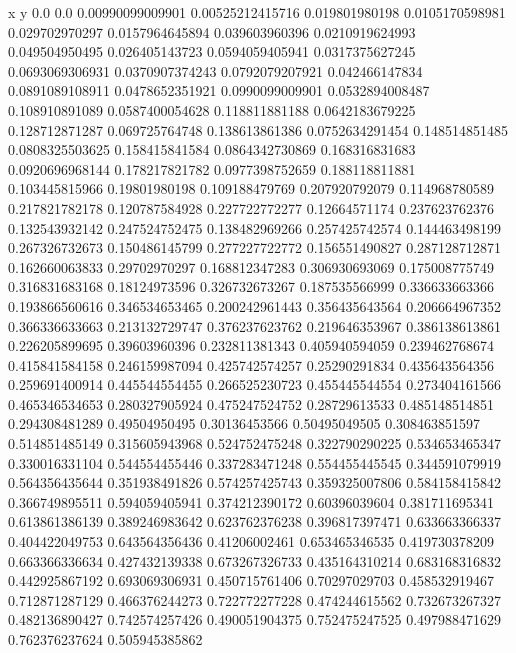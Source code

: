               x                y
            0.0              0.0
0.00990099009901  0.00525212415716
 0.019801980198  0.0105170598981
 0.029702970297  0.0157964645894
 0.039603960396  0.0210919624993
 0.049504950495   0.026405143723
0.0594059405941  0.0317375627245
0.0693069306931  0.0370907374243
0.0792079207921   0.042466147834
0.0891089108911  0.0478652351921
0.0990099009901  0.0532894008487
 0.108910891089  0.0587400054628
 0.118811881188  0.0642183679225
 0.128712871287   0.069725764748
 0.138613861386  0.0752634291454
 0.148514851485  0.0808325503625
 0.158415841584  0.0864342730869
 0.168316831683  0.0920696968144
 0.178217821782  0.0977398752659
 0.188118811881   0.103445815966
  0.19801980198   0.109188479769
 0.207920792079   0.114968780589
 0.217821782178   0.120787584928
 0.227722772277    0.12664571174
 0.237623762376   0.132543932142
 0.247524752475   0.138482969266
 0.257425742574   0.144463498199
 0.267326732673   0.150486145799
 0.277227722772   0.156551490827
 0.287128712871   0.162660063833
  0.29702970297   0.168812347283
 0.306930693069   0.175008775749
 0.316831683168    0.18124973596
 0.326732673267   0.187535566999
 0.336633663366   0.193866560616
 0.346534653465   0.200242961443
 0.356435643564   0.206664967352
 0.366336633663   0.213132729747
 0.376237623762   0.219646353967
 0.386138613861   0.226205899695
  0.39603960396   0.232811381343
 0.405940594059   0.239462768674
 0.415841584158   0.246159987094
 0.425742574257    0.25290291834
 0.435643564356   0.259691400914
 0.445544554455   0.266525230723
 0.455445544554   0.273404161566
 0.465346534653   0.280327905924
 0.475247524752    0.28729613533
 0.485148514851   0.294308481289
  0.49504950495    0.30136453566
  0.50495049505   0.308463851597
 0.514851485149   0.315605943968
 0.524752475248   0.322790290225
 0.534653465347   0.330016331104
 0.544554455446   0.337283471248
 0.554455445545   0.344591079919
 0.564356435644   0.351938491826
 0.574257425743   0.359325007806
 0.584158415842   0.366749895511
 0.594059405941   0.374212390172
  0.60396039604   0.381711695341
 0.613861386139   0.389246983642
 0.623762376238   0.396817397471
 0.633663366337   0.404422049753
 0.643564356436    0.41206002461
 0.653465346535   0.419730378209
 0.663366336634   0.427432139338
 0.673267326733   0.435164310214
 0.683168316832   0.442925867192
 0.693069306931   0.450715761406
  0.70297029703   0.458532919467
 0.712871287129   0.466376244273
 0.722772277228   0.474244615562
 0.732673267327   0.482136890427
 0.742574257426   0.490051904375
 0.752475247525   0.497988471629
 0.762376237624   0.505945385862
